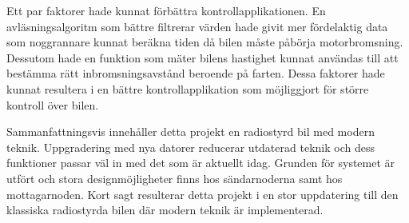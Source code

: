 \documentclass[a4paper]{article}
\begin{document}
\vspace{5mm} \noindent
Ett par faktorer hade kunnat förbättra kontrollapplikationen. En avläsningsalgoritm som bättre filtrerar värden hade givit mer fördelaktig data som noggrannare kunnat beräkna tiden då bilen måste påbörja motorbromsning. Dessutom hade en funktion som mäter bilens hastighet kunnat användas till att bestämma rätt inbromsningsavstånd beroende på farten. Dessa faktorer hade kunnat resultera i en bättre kontrollapplikation som möjliggjort för större kontroll över bilen.



\vspace{5mm} \noindent
Sammanfattningsvis innehåller detta projekt en radiostyrd bil med modern teknik. Uppgradering med nya datorer reducerar utdaterad teknik och dess funktioner passar väl in med det som är aktuellt idag. Grunden för systemet är utfört och stora designmöjligheter finns hos sändarnoderna samt hos mottagarnoden. Kort sagt resulterar detta projekt i en stor uppdatering till den klassiska radiostyrda bilen där modern teknik är implementerad.




\newpage


\end{document}
